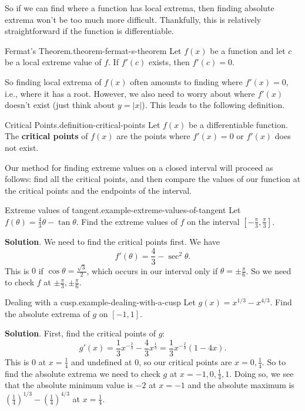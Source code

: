 \documentclass[10pt,]{book}
\newcommand{\terminology}[1]{\textbf{#1}}
\numberwithin{equation}{section}
\begin{document}
\hypertarget{p-319}{}%
So if we can find where a function has local extrema, then finding absolute extrema won't be too much more difficult. Thankfully, this is relatively straightforward if the function is differentiable.%
\begin{theorem}{Fermat's Theorem.}{}{theorem-fermat-s-theorem}%
\hypertarget{p-320}{}%
Let \(f(x)\) be a function and let \(c\) be a local extreme value of \(f\). If \(f'(c)\) exists, then \(f'(c) = 0\).%
\end{theorem}
\hypertarget{p-321}{}%
So finding local extrema of \(f(x)\) often amounts to finding where \(f'(x) = 0\), i.e., where it has a root. However, we also need to worry about where \(f'(x)\) doesn't exist (just think about \(y = |x|\)). This leads to the following definition.%
\begin{definition}{Critical Points.}{definition-critical-points}%
\hypertarget{p-322}{}%
Let \(f(x)\) be a differentiable function. The \terminology{critical points} of \(f(x)\) are the points where \(f'(x) = 0\) or \(f'(x)\) does not exist.%
\end{definition}
\hypertarget{p-323}{}%
Our method for finding extreme values on a closed interval will proceed as follows: find all the critical points, and then compare the values of our function at the critical points and the endpoints of the interval.%
\begin{example}{Extreme values of tangent.}{example-extreme-values-of-tangent}%
\hypertarget{p-324}{}%
Let \(f(\theta) = \frac{4}{3}\theta - \tan\theta\). Find the extreme values of \(f\) on the interval \([-\frac{\pi}{3},\frac{\pi}{3}]\).%
\par\smallskip%
\noindent\textbf{Solution}.\hypertarget{solution-71}{}\quad%
\hypertarget{p-325}{}%
We need to find the critical points first. We have%
\begin{equation*}
f'(\theta) = \frac{4}{3} - \sec^{2}\theta.
\end{equation*}
This is \(0\) if \(\cos\theta = \frac{\sqrt{3}}{2}\), which occurs in our interval only if \(\theta = \pm\frac{\pi}{6}\). So we need to check \(f\) at \(\pm\frac{\pi}{3},\pm\frac{\pi}{6}\).%
\end{example}
\begin{example}{Dealing with a cusp.}{example-dealing-with-a-cusp}%
\hypertarget{p-326}{}%
Let \(g(x) = x^{1/3} - x^{4/3}\). Find the absolute extrema of \(g\) on \([-1,1]\).%
\par\smallskip%
\noindent\textbf{Solution}.\hypertarget{solution-72}{}\quad%
\hypertarget{p-327}{}%
First, find the critical points of \(g\):%
\begin{equation*}
g'(x) = \frac{1}{3}x^{-\frac{2}{3}} - \frac{4}{3}x^{\frac{1}{3}} = \frac{1}{3}x^{-\frac{2}{3}}(1 - 4x).
\end{equation*}
This is \(0\) at \(x = \frac{1}{4}\) and undefined at \(0\), so our critical points are \(x=0,\frac{1}{4}\). So to find the absolute extrema we need to check \(g\) at \(x=-1,0,\frac{1}{4},1\). Doing so, we see that the absolute minimum value is \(-2\) at \(x=-1\) and the absolute maximum is \((\frac{1}{4})^{1/3} - (\frac{1}{4})^{4/3}\) at \(x = \frac{1}{4}\).%
\end{example}
\end{document}
